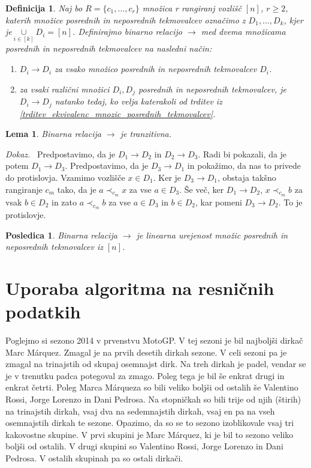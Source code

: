 \documentclass[a4paper, 12pt]{book}
\newtheorem{definicija}{Definicija}[chapter]
\newtheorem{lema}{Lema}[chapter]
\newtheorem{posledica}{Posledica}[chapter]
\newenvironment{dokaz}{\emph{Dokaz.}\ }{\hspace{\fill}{$\Box$}}
\begin{document}
\begin{definicija}
\label{definicija_relacije_mnozic_posrednih_tekmovalcev}
    Naj bo $R = \{ c_1, \dots, c_r \}$ množica r rangiranj vozlišč $[n]$, $r \geq 2$, katerih množice posrednih in neposrednih tekmovalcev označimo z $D_1, \dots, D_k$, kjer je$\underset{i \in [k]}{\cup} D_i = [n]$. Definirajmo binarno relacijo $\rightarrow$ med dvema množicama posrednih in neposrednih tekmovalcev na nasledni način:
    \begin{enumerate}[label=(\roman*)]
        \item $D_i \rightarrow D_i$ za vsako množico posrednih in neposrednih tekmovalcev $D_i$.
        \item za vsaki različni množici $D_i, D_j$ posrednih in neposrednih tekmovalcev, je $D_i \rightarrow D_j$ natanko tedaj, ko velja katerakoli od trditev iz \ref{trditev_ekvivalenc_mnozic_posrednih_tekmovalcev}.
    \end{enumerate}
\end{definicija}

\begin{lema}
    Binarna relacija $\rightarrow$ je tranzitivna.
\end{lema}
\begin{dokaz}
    Predpostavimo, da je $D_1 \rightarrow D_2$ in $D_2 \rightarrow D_3$. Radi bi pokazali, da je potem $D_1 \rightarrow D_3$. Predpostavimo, da je $D_3 \rightarrow D_1$ in pokažimo, da nas to privede do protislovja. Vzamimo vozlišče $x \in D_1$. Ker je $D_3 \rightarrow D_1$, obstaja takšno rangiranje $c_m$ tako, da je $a \prec_{c_m} x$ za vse $a \in D_3$. Še več, ker $D_1 \rightarrow D_2$, $x \prec_{c_m} b$ za vsak $b \in D_2$ in zato $a \prec_{c_m} b$ za vse $a \in D_3$ in $b \in D_2$, kar pomeni $D_3 \rightarrow D_2$. To je protislovje.
\end{dokaz}

\begin{posledica}
    Binarna relacija $\rightarrow$ je linearna urejenost množic posrednih in neposrednih tekmovalcev iz $[n]$.
\end{posledica}


\section{Uporaba algoritma na resničnih podatkih}

Poglejmo si sezono 2014 v prvenstvu MotoGP. V tej sezoni je bil najboljši dirkač Marc Márquez. Zmagal je na prvih desetih dirkah sezone. V celi sezoni pa je zmagal na trinajstih od skupaj osemnajst dirk. Na treh dirkah je padel, vendar se je v trenutku padca potegoval za zmago. Poleg tega je bil še enkrat drugi in enkrat četrti. Poleg Marca Márqueza so bili veliko boljši od ostalih še Valentino Rossi, Jorge Lorenzo in Dani Pedrosa. Na stopničkah so bili trije od njih (štirih) na trinajstih dirkah, vsaj dva na sedemnajstih dirkah, vsaj en pa na vseh osemnajstih dirkah te sezone. Opazimo, da so se to sezono izoblikovale vsaj tri kakovostne skupine. V prvi skupini je Marc Márquez, ki je bil to sezono veliko boljši od ostalih. V drugi skupini so Valentino Rossi, Jorge Lorenzo in Dani Pedrosa. V ostalih skupinah pa so ostali dirkači.
\end{document}

